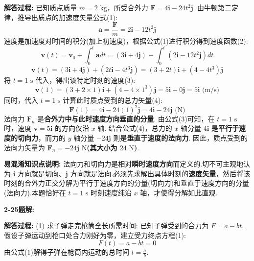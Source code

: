 \textbf{解答过程:}
已知质点质量 $m = 2\text{ kg}$，所受合外力 $\mathbf{F} = 4\mathbf{i} - 24t^2\mathbf{j}$.
由牛顿第二定律，推导出质点的加速度矢量公式(1):
\begin{equation}
	\mathbf{a} = \frac{\mathbf{F}}{m} = 2\mathbf{i} - 12t^2\mathbf{j}
\end{equation}
速度是加速度对时间的积分(加上初速度)，根据公式(1)进行积分得到速度函数(2):
\begin{equation}
	\mathbf{v}(t) = \mathbf{v}_0 + \int_{0}^{t} \mathbf{a} dt = (3\mathbf{i} + 4\mathbf{j}) + \int_{0}^{t} (2\mathbf{i} - 12t^2\mathbf{j}) dt
\end{equation}
$$\mathbf{v}(t) = (3\mathbf{i} + 4\mathbf{j}) + (2t\mathbf{i} - 4t^3\mathbf{j}) = (3 + 2t)\mathbf{i} + (4 - 4t^3)\mathbf{j}$$
将 $t = 1\text{ s}$ 代入，得出该特定时刻的速度(3):
\begin{equation}
	\mathbf{v}(1) = (3 + 2 \times 1)\mathbf{i} + (4 - 4 \times 1^3)\mathbf{j} = 5\mathbf{i} + 0\mathbf{j} = 5\mathbf{i}\text{ (m/s)}
\end{equation}
同时，代入 $t = 1\text{ s}$ 计算此时质点受到的总力矢量(4):
\begin{equation}
	\mathbf{F}(1) = 4\mathbf{i} - 24(1)^2\mathbf{j} = 4\mathbf{i} - 24\mathbf{j}\text{ (N)}
\end{equation}
法向力 $\mathbf{F}_n$ 是\textbf{合外力中与此时速度方向垂直的分量}.
由公式(3)可知，在 $t = 1\text{ s}$ 时，速度 $\mathbf{v} = 5\mathbf{i}$ 的方向仅沿 $x$ 轴.
结合公式(4)，总力的 $x$ 轴分量 $4\mathbf{i}$ 是\textbf{平行于速度的切向力}，而力的 $y$ 轴分量 $-24\mathbf{j}$ 则是\textbf{垂直于速度的法向力}.
因此，质点受到的法向力矢量为 $\mathbf{F}_n = -24\mathbf{j}\text{ N}$\textbf{(其大小为 $24\text{ N}$)}.

\textbf{易混淆知识点说明:}
法向力和切向力是相对\textbf{瞬时速度方向}而定义的.切不可主观地认为 $\mathbf{i}$ 方向就是切向、$\mathbf{j}$ 方向就是法向.必须先求解出具体时刻的\textbf{速度矢量}，然后将该时刻的合外力正交分解为平行于速度方向的分量(切向力)和垂直于速度方向的分量(法向力).本题恰好在 $t=1\text{ s}$ 时刻速度纯沿 $x$ 轴，才使得分解如此直观.

\vspace{2em}

\textbf{2-25题解:}


\textbf{解答过程:}
(1) 求子弹走完枪筒全长所需时间:
已知子弹受到的合力为 $F = a - bt$.
假设子弹运动到枪口处合力刚好为零，建立受力终点方程(1):
\begin{equation}
	F(t) = a - bt = 0
\end{equation}
由公式(1)解得子弹在枪筒内运动的总时间 $t = \frac{a}{b}$.

